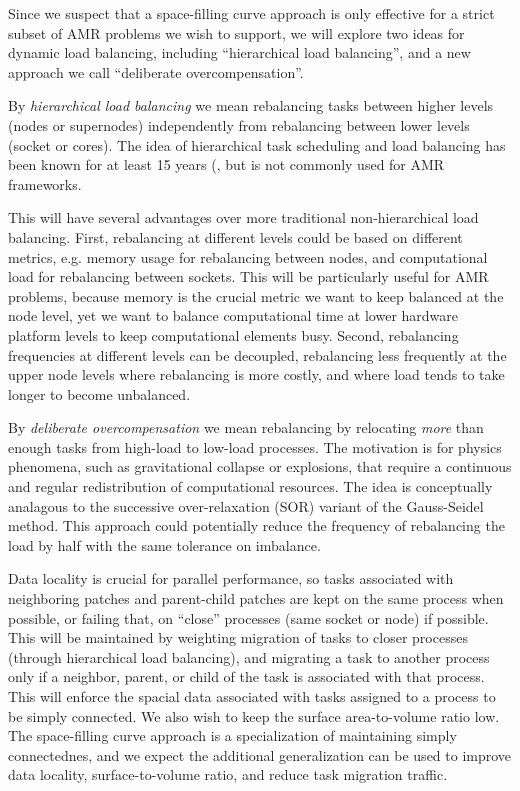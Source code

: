 \documentclass[14pt,letter]{article}
\begin{document}
Since we suspect that a space-filling curve approach is only effective
for a strict subset of AMR problems we wish to support, we will
explore two ideas for dynamic load balancing, including ``hierarchical
load balancing'', and a new approach we call ``deliberate
overcompensation''.

%
By \textit{hierarchical load balancing} we mean rebalancing tasks
between higher levels (nodes or supernodes) independently from
rebalancing between lower levels (socket or cores).  The idea of
hierarchical task scheduling and load balancing has been known for at
least 15 years (\cite{AhGh94}, but is not commonly used for AMR
frameworks.

This will have several advantages over more traditional
non-hierarchical load balancing.  First, rebalancing at different
levels could be based on different metrics, e.g. memory usage for
rebalancing between nodes, and computational load for rebalancing
between sockets.  This will be particularly useful for AMR problems,
because memory is the crucial metric we want to keep balanced at the
node level, yet we want to balance computational time at lower
hardware platform levels to keep computational elements busy.  Second,
rebalancing frequencies at different levels can be decoupled,
rebalancing less frequently at the upper node levels where rebalancing
is more costly, and where load tends to take longer to become
unbalanced.

%
By \textit{deliberate overcompensation} we mean rebalancing by
relocating \textit{more} than enough tasks from high-load to low-load
processes.  The motivation is for physics phenomena, such as
gravitational collapse or explosions, that require a continuous and
regular redistribution of computational resources.  The idea is
conceptually analagous to the successive over-relaxation (SOR) variant
of the Gauss-Seidel method.  This approach could potentially reduce
the frequency of rebalancing the load by half with the same tolerance
on imbalance.

%
Data locality is crucial for parallel performance, so tasks associated
with neighboring patches and parent-child patches are kept on the same
process when possible, or failing that, on ``close'' processes (same
socket or node) if possible.  This will be maintained by weighting
migration of tasks to closer processes (through hierarchical load
balancing), and migrating a task to another process only if a
neighbor, parent, or child of the task is associated with that
process.  This will enforce the spacial data associated with tasks
assigned to a process to be simply connected.  We also wish to keep
the surface area-to-volume ratio low.  The space-filling curve
approach is a specialization of maintaining simply connectednes, and
we expect the additional generalization can be used to improve data
locality, surface-to-volume ratio, and reduce task migration traffic.
\end{document}
